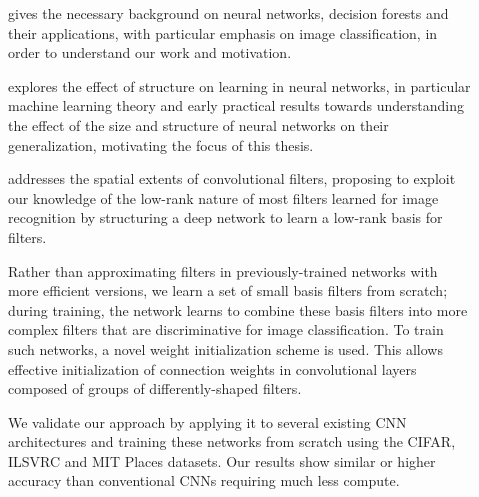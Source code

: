 \documentclass[thesis]{subfiles}
\begin{document}
\begin{description}
	\item[] gives the necessary background on neural networks, decision forests and their applications, with particular emphasis on image classification, in order to understand our work and motivation.
	
	\item[] explores the effect of structure on learning in neural networks, in particular machine learning theory and early practical results towards understanding the effect of the size and structure of neural networks on their generalization, motivating the focus of this thesis.
	
	\item[] addresses the spatial extents of convolutional filters, proposing to exploit our knowledge of the low-rank nature of most filters learned for image recognition by structuring a deep network to learn a low-rank basis for filters.
	
	Rather than approximating filters in previously-trained networks with more efficient versions, we learn a set of small basis filters from scratch; during training, the network learns to combine these basis filters into more complex filters that are discriminative for image classification. To train such networks, a novel weight initialization scheme is used. This allows effective initialization of connection weights in convolutional layers composed of groups of differently-shaped filters. 
	
	We validate our approach by applying it to several existing CNN architectures and training these networks from scratch using the CIFAR, ILSVRC and MIT Places datasets. Our results show similar or higher accuracy than conventional CNNs requiring much less compute. %
	

\end{description}
\end{document}
